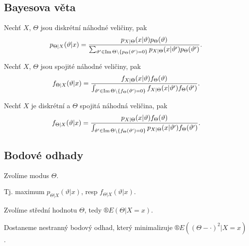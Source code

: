 \documentclass[12pt]{article}					%
\begin{document}
\subsection{Bayesova věta}

\begin{veta}
	Nechť $X$, $\Theta$ jsou diskrétní náhodné veličiny, pak
	$$ p_{\Theta | X}(\vartheta | x) = \frac{p_{X|\Theta}(x|\vartheta) p_\Theta(\vartheta)}{\sum_{\vartheta' \in \operatorname{Im} \Theta \setminus \{p_\Theta(\vartheta') = 0\}} p_{X|\Theta}(x|\vartheta')p_\Theta(\vartheta')}. $$
\end{veta}

\begin{veta}
	Nechť $X$, $\Theta$ jsou spojité náhodné veličiny, pak
	$$ f_{\Theta | X}(\vartheta | x) = \frac{f_{X|\Theta}(x|\vartheta) f_\Theta(\vartheta)}{\int_{\vartheta' \in \operatorname{Im} \Theta \setminus \{f_\Theta(\vartheta') = 0\}} f_{X|\Theta}(x|\vartheta')f_\Theta(\vartheta')}. $$
\end{veta}

\begin{veta}
	Nechť $X$ je diskrétní a $\Theta$ spojitá náhodná veličina, pak
	$$ f_{\Theta | X}(\vartheta | x) = \frac{p_{X|\Theta}(x|\vartheta) f_\Theta(\vartheta)}{\int_{\vartheta' \in \operatorname{Im} \Theta \setminus \{f_\Theta(\vartheta') = 0\}} p_{X|\Theta}(x|\vartheta')f_\Theta(\vartheta')}. $$
\end{veta}

\subsection{Bodové odhady}

\begin{definice}
	Zvolíme modus $\Theta$.

	\begin{poznamkain}
		Tj. maximum $p_{\Theta|X}(\vartheta|x)$, resp $f_{\Theta|X}(\vartheta|x)$.
	\end{poznamkain}
\end{definice}

\begin{definice}
	Zvolíme střední hodnotu $\Theta$, tedy $®E(\Theta | X = x)$.

	\begin{poznamka}
		Dostaneme nestranný bodový odhad, který minimalizuje $®E((\Theta - ·)^2 | X = x)$.
	\end{poznamka}
\end{definice}
\end{document}
